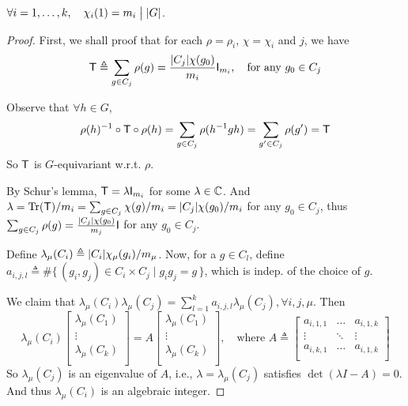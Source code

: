 \begin{theorem}[Divisibility]
  $\forall i = 1, \dots, k, \quad \chi_i(1) = m_i \mathrel{\big|} \lvert G\rvert$.

  \begin{proof} \mbox{}
    First, we shall proof that for each $\rho=\rho_i$, $\chi = \chi_i$ and $j$, we have
    \[
      {\sf T} \triangleq \sum_{g\in C_j} \rho(g) = \frac{\lvert C_j\rvert\chi(g_0)}{m_i}
      {\sf I}_{m_i}, \quad \text{for any } g_0 \in C_j
    \]

    Observe that $\forall h \in G$,
    \[
      \rho(h)^{-1}\circ{\sf T}\circ\rho(h) = \sum_{g\in C_j} \rho(h^{-1}gh)
      = \sum_{g'\in C_j} \rho(g') = {\sf T}
    \]
    So ${\sf T}$ is $G$-equivariant w.r.t. $\rho$.

    By Schur's lemma, ${\sf T} = \lambda {\sf I}_{m_i}$ for some $\lambda \in \mathbb{C}$.
    And $\lambda = \operatorname{Tr}({\sf T}) / m_i = \sum_{g\in C_j} \chi(g) / m_i = \lvert C_j\rvert\chi(g_0) / m_i$
    for any $g_0 \in C_j$, thus $\sum_{g \in C_j} \rho(g) = \frac{\lvert C_j\rvert\chi(g_0)}{m_j} {\sf I}$
    for any $g_0 \in C_j$.

    Define $\lambda_\mu(C_i) \triangleq \lvert C_i\rvert\chi_\mu(g_i) / m_\mu$.
    Now, for a $g \in C_l$, define $a_{i,j,l} \triangleq \# \{\, (g_i, g_j) \in C_i \times C_j \mid
    g_ig_j = g \,\}$, which is indep. of the choice of $g$.

    We claim that $\lambda_\mu(C_i)\lambda_\mu(C_j) = \sum_{l=1}^k a_{i,j,l} \lambda_\mu(C_j)
    ,\forall i, j, \mu$. Then
    \[ \lambda_\mu(C_i)
      \begin{bmatrix}
        \lambda_\mu(C_1) \\
        \vdots \\
        \lambda_\mu(C_k) \\
      \end{bmatrix}
      = A
      \begin{bmatrix}
        \lambda_\mu(C_1) \\
        \vdots \\
        \lambda_\mu(C_k) \\
      \end{bmatrix}, \quad
      \text{where } A \triangleq
      \begin{bmatrix}
        a_{i, 1, 1} & \hdots & a_{i, 1, k} \\
        \vdots & \ddots & \vdots \\
        a_{i, k, 1} & \hdots & a_{i, 1, k} \\
      \end{bmatrix}
    \]
    So $\lambda_\mu(C_j)$ is an eigenvalue of
    $A$, i.e., $\lambda = \lambda_\mu(C_j)$ satisfies $\det(\lambda I - A) = 0$.
    And thus $\lambda_\mu(C_i)$ is an algebraic integer.


\end{proof}
\end{theorem}
